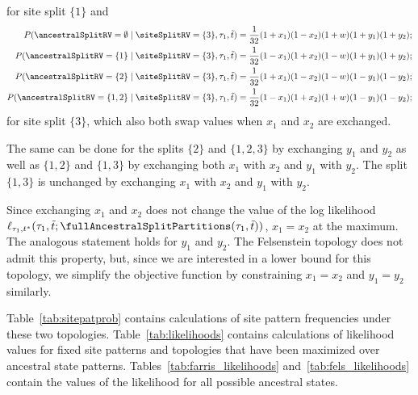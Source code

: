 for site split $\{1\}$ and
\begin{align*}
        P(\ancestralSplitRV=\emptyset \mid \siteSplitRV=\{3\}, \tau_1, \tilde{t}) &= \frac{1}{32}(1+x_1)(1-x_2)(1+w)(1+y_1)(1+y_2); \\
    P(\ancestralSplitRV=\{1\} \mid \siteSplitRV=\{3\}, \tau_1, \tilde{t}) &= \frac{1}{32}(1-x_1)(1+x_2)(1-w)(1+y_1)(1+y_2); \\
    P(\ancestralSplitRV=\{2\} \mid \siteSplitRV=\{3\}, \tau_1, \tilde{t}) &= \frac{1}{32}(1+x_1)(1-x_2)(1-w)(1-y_1)(1-y_2); \\
    P(\ancestralSplitRV=\{1,2\} \mid \siteSplitRV=\{3\}, \tau_1, \tilde{t}) &= \frac{1}{32}(1-x_1)(1+x_2)(1+w)(1-y_1)(1-y_2);
\end{align*}
for site split $\{3\}$, which also both swap values when $x_1$ and $x_2$ are exchanged.

The same can be done for the splits $\{2\}$ and $\{1,2,3\}$ by exchanging $y_1$ and $y_2$ as well as $\{1,2\}$ and $\{1,3\}$ by exchanging both $x_1$ with $x_2$ and $y_1$ with $y_2$.
The split $\{1,3\}$ is unchanged by exchanging $x_1$ with $x_2$ and $y_1$ with $y_2$.

Since exchanging $x_1$ and $x_2$ does not change the value of the log likelihood $\ell_{\tau_1,t^*}(\tau_1, \tilde{t}; \fullAncestralSplitPartitions(\tau_1,\tilde{t}))$, $x_1=x_2$ at the maximum.
The analogous statement holds for $y_1$ and $y_2$.
The Felsenstein topology does not admit this property, but, since we are interested in a lower bound for this topology, we simplify the objective function by constraining $x_1=x_2$ and $y_1=y_2$ similarly.

Table~\ref{tab:sitepatprob} contains calculations of site pattern frequencies under these two topologies.
Table~\ref{tab:likelihoods} contains calculations of likelihood values for fixed site patterns and topologies that have been maximized over ancestral state patterns.
Tables~\ref{tab:farris_likelihoods} and~\ref{tab:fels_likelihoods} contain the values of the likelihood for all possible ancestral states.

